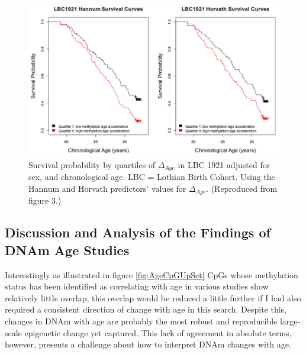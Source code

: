 \documentclass[
]{book}
\begin{document}
\begin{figure}
\includegraphics[width=12.47in]{figs/Marioni2015f3} \caption{Survival probability by quartiles of \(\Delta_{Age}\) in LBC 1921 adjusted for sex, and chronological age. LBC = Lothian Birth Cohort. Using the Hannum and Horvath predictors' values for \(\Delta_{Age}\).
(Reproduced from \citet{Marioni2015} figure 3.)}\label{fig:Marioni2015f3}
\end{figure}




\hypertarget{discussion-and-analysis-of-the-findings-of-dnam-age-studies}{%
\subsection{Discussion and Analysis of the Findings of DNAm Age Studies}\label{discussion-and-analysis-of-the-findings-of-dnam-age-studies}}

Interestingly as illustrated in figure \ref{fig:AgeCpGUpSet} CpGs whose methylation status has been identified as correlating with age in various studies show relatively little overlap, this overlap would be reduced a little further if I had also required a consistent direction of change with age in this search. Despite this, changes in DNAm with age are probably the most robust and reproducible large-scale epigenetic change yet captured. This lack of agreement in absolute terms, however, presents a challenge about how to interpret DNAm changes with age.
\end{document}
